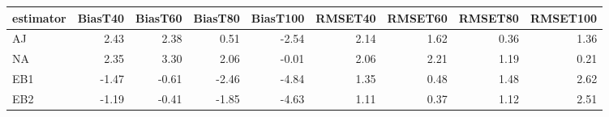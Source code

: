 \begin{table}[ht]
\centering
\begin{tabular}{lrrrrrrrr}
  \toprule
estimator & BiasT40 & BiasT60 & BiasT80 & BiasT100 & RMSET40 & RMSET60 & RMSET80 & RMSET100 \\ 
  \midrule
AJ & 2.43 & 2.38 & 0.51 & -2.54 & 2.14 & 1.62 & 0.36 & 1.36 \\ 
  NA & 2.35 & 3.30 & 2.06 & -0.01 & 2.06 & 2.21 & 1.19 & 0.21 \\ 
  EB1 & -1.47 & -0.61 & -2.46 & -4.84 & 1.35 & 0.48 & 1.48 & 2.62 \\ 
  EB2 & -1.19 & -0.41 & -1.85 & -4.63 & 1.11 & 0.37 & 1.12 & 2.51 \\ 
   \bottomrule
\end{tabular}
\end{table}
